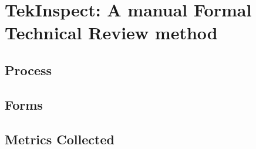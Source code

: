 
\section{TekInspect: A manual Formal Technical Review method}
\label{sec:manual} 

\subsection{Process}

\subsection{Forms}

\subsection{Metrics Collected}
